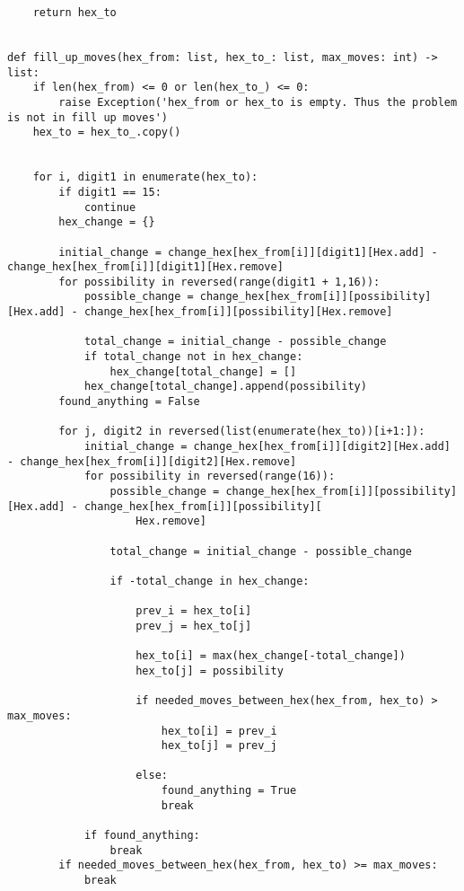 \documentclass[a4paper,10pt,ngerman]{scrartcl}
\begin{document}
\begin{lstlisting}
    return hex_to


def fill_up_moves(hex_from: list, hex_to_: list, max_moves: int) -> list:
    if len(hex_from) <= 0 or len(hex_to_) <= 0:
        raise Exception('hex_from or hex_to is empty. Thus the problem is not in fill up moves')
    hex_to = hex_to_.copy()


    for i, digit1 in enumerate(hex_to):
        if digit1 == 15:
            continue
        hex_change = {}

        initial_change = change_hex[hex_from[i]][digit1][Hex.add] - change_hex[hex_from[i]][digit1][Hex.remove]
        for possibility in reversed(range(digit1 + 1,16)):
            possible_change = change_hex[hex_from[i]][possibility][Hex.add] - change_hex[hex_from[i]][possibility][Hex.remove]

            total_change = initial_change - possible_change
            if total_change not in hex_change:
                hex_change[total_change] = []
            hex_change[total_change].append(possibility)
        found_anything = False

        for j, digit2 in reversed(list(enumerate(hex_to))[i+1:]):
            initial_change = change_hex[hex_from[i]][digit2][Hex.add] - change_hex[hex_from[i]][digit2][Hex.remove]
            for possibility in reversed(range(16)):
                possible_change = change_hex[hex_from[i]][possibility][Hex.add] - change_hex[hex_from[i]][possibility][
                    Hex.remove]

                total_change = initial_change - possible_change

                if -total_change in hex_change:

                    prev_i = hex_to[i]
                    prev_j = hex_to[j]

                    hex_to[i] = max(hex_change[-total_change])
                    hex_to[j] = possibility

                    if needed_moves_between_hex(hex_from, hex_to) > max_moves:
                        hex_to[i] = prev_i
                        hex_to[j] = prev_j

                    else:
                        found_anything = True
                        break

            if found_anything:
                break
        if needed_moves_between_hex(hex_from, hex_to) >= max_moves:
            break






\end{lstlisting}
\end{document}

